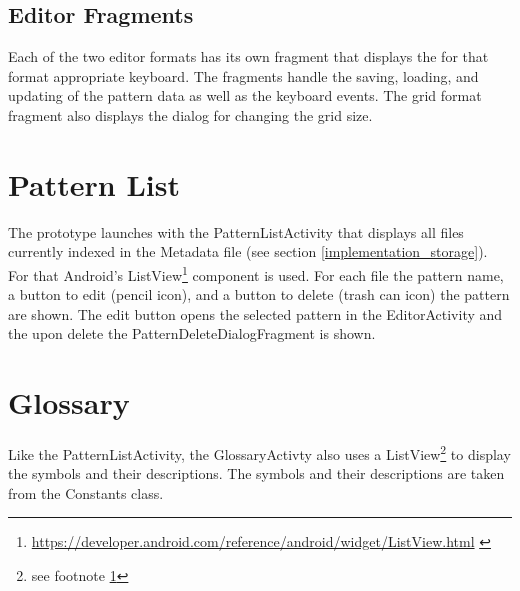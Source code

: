 \subsection*{Editor Fragments}
Each of the two editor formats has its own fragment that displays the for that format appropriate keyboard. The fragments handle the saving, loading, and updating of the pattern data as well as the keyboard events. The grid format fragment also displays the dialog for changing the grid size.

\section{Pattern List}
The prototype launches with the PatternListActivity that displays all files currently indexed in the Metadata file (see section \ref{implementation_storage}). For that Android's ListView\footnote{\url{https://developer.android.com/reference/android/widget/ListView.html} \label{url_footnote}} component is used. For each file the pattern name, a button to edit (pencil icon), and a button to delete (trash can icon) the pattern are shown. The edit button opens the selected pattern in the EditorActivity and the upon delete the PatternDeleteDialogFragment is shown.

\section{Glossary}
Like the PatternListActivity, the GlossaryActivty also uses a ListView\footnote{see footnote \ref{url_footnote}} to display the symbols and their descriptions. The symbols and their descriptions are taken from the Constants class.